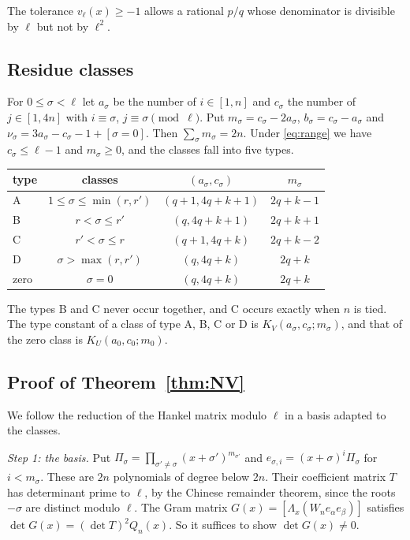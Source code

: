 \documentclass[11pt]{amsart}
\theoremstyle{definition}
\theoremstyle{remark}
\numberwithin{equation}{section}
\begin{document}
The tolerance $v_\ell(x)\ge-1$ allows a rational $p/q$ whose denominator is divisible by $\ell$ but not by $\ell^2$.

\subsection{Residue classes}
For $0\le\sigma<\ell$ let $a_\sigma$ be the number of $i\in[1,n]$ and $c_\sigma$ the number of $j\in[1,4n]$ with
$i\equiv\sigma$, $j\equiv\sigma\pmod\ell$. Put $m_\sigma=c_\sigma-2a_\sigma$, $b_\sigma=c_\sigma-a_\sigma$ and
$\nu_\sigma=3a_\sigma-c_\sigma-1+[\sigma=0]$. Then $\sum_\sigma m_\sigma=2n$. Under \eqref{eq:range} we have
$c_\sigma\le\ell-1$ and $m_\sigma\ge0$, and the classes fall into five types.

\begin{center}
\begin{tabular}{@{}lccc@{}}
\toprule
type & classes & $(a_\sigma,c_\sigma)$ & $m_\sigma$\\
\midrule
A & $1\le\sigma\le\min(r,r')$ & $(q+1,4q+k+1)$ & $2q+k-1$\\
B & $r<\sigma\le r'$ & $(q,4q+k+1)$ & $2q+k+1$\\
C & $r'<\sigma\le r$ & $(q+1,4q+k)$ & $2q+k-2$\\
D & $\sigma>\max(r,r')$ & $(q,4q+k)$ & $2q+k$\\
zero & $\sigma=0$ & $(q,4q+k)$ & $2q+k$\\
\bottomrule
\end{tabular}
\end{center}

The types B and C never occur together, and C occurs exactly when $n$ is tied. The type constant of a class of type A,
B, C or D is $K_V(a_\sigma,c_\sigma;m_\sigma)$, and that of the zero class is $K_U(a_0,c_0;m_0)$.

\subsection{Proof of Theorem~\ref{thm:NV}}
We follow the reduction of the Hankel matrix modulo $\ell$ in a basis adapted to the classes.

\emph{Step 1: the basis.} Put $\Pi_\sigma=\prod_{\sigma'\ne\sigma}(x+\sigma')^{m_{\sigma'}}$ and
$e_{\sigma,i}=(x+\sigma)^i\Pi_\sigma$ for $i<m_\sigma$. These are $2n$ polynomials of degree below $2n$. Their
coefficient matrix $T$ has determinant prime to $\ell$, by the Chinese remainder theorem, since the roots
$-\sigma$ are distinct modulo $\ell$. The Gram matrix $G(x)=[\Lambda_x(W_ne_\alpha e_\beta)]$ satisfies
$\det G(x)=(\det T)^2Q_n(x)$. So it suffices to show $\det G(x)\ne0$.
\end{document}
